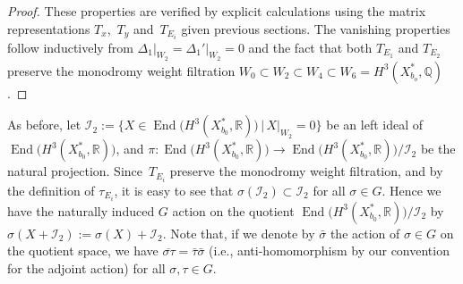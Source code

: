 \documentclass[pdftex]{sigma}
\numberwithin{equation}{section}
\begin{document}
\begin{proof} These properties are verified by explicit calculations using the matrix representa\-tions $T_{x}$,~$T_{y}$ and~$T_{E_{i}}$ given previous sections. The vanishing properties follow inductively from $\Delta_{1}\vert_{W_{2}}=\Delta_{1}'\vert_{W_{2}}=0$ and the fact that both $T_{E_{1}}$ and $T_{E_{2}}$ preserve the monodromy weight filtration $W_{0}\subset W_{2}\subset W_{4}\subset W_{6}=H^{3}(X_{b_{o}}^{*},\mathbb{Q})$.
\end{proof}

As before, let $\mathcal{I}_{2}:=\big\{ X\in\operatorname{End}\big(H^{3}(X_{b_{0}}^{*},\mathbb{R})\big)\,|\, X\vert_{W_{2}}=0\big\} $ be an left ideal of $\operatorname{End}\big(H^{3}(X_{b_{0}}^{*},\mathbb{R})\big)$, and $\pi\colon \operatorname{End}\big(H^{3}(X_{b_{0}}^{*},\mathbb{R})\big)\to\operatorname{End}\big(H^{3}(X_{b_{0}}^{*},\mathbb{R})\big)/\mathcal{I}_{2}$ be the natural projection. Since~$T_{E_{i}}$ preserve the monodromy weight filtration, and by the definition of $\tau_{E_{i}}$, it is easy to see that $\sigma(\mathcal{I}_{2})\subset\mathcal{I}_{2}$ for all $\sigma\in G$. Hence we have the naturally induced $G$ action on the quotient $\operatorname{End}\big(H^{3}(X_{b_{0}}^{*},\mathbb{R})\big)/\mathcal{I}_{2}$ by $\sigma(X+\mathcal{I}_{2}):=\sigma(X)+\mathcal{I}_{2}$. Note that, if we denote by $\bar{\sigma}$ the action of $\sigma\in G$ on the quotient space, we have $\overline{\sigma\tau}=\bar{\tau}\bar{\sigma}$ (i.e., anti-homomorphism by our convention for the adjoint action) for all $\sigma,\tau\in G$.
\end{document}
